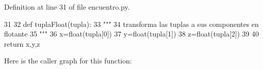\-Definition at line 31 of file encuentro.\-py.


\begin{DoxyCode}
31 
32 def tuplaFloat(tupla):
33     """
34     transforma las tuplas a sus componentes en flotante
35     """
36     x=float(tupla[0])
37     y=float(tupla[1])
38     z=float(tupla[2])
39     
40     return x,y,z

\end{DoxyCode}


\-Here is the caller graph for this function\-:


